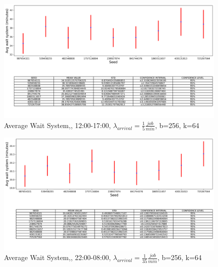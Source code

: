 \documentclass{article}
\begin{document}
\begin{figure}[H]
	\centering
	\captionsetup{justification=centering,margin=2cm}
	\includegraphics[scale=0.48]{images/avg_ws_steady_state_aft.png}
	\caption{Average Wait System,, 12:00-17:00, $\lambda_{arrival}=\frac{1}{5} \frac{job}{min}$, b=256, k=64}\label{figura:avg_ws_steady_state_eve}
\end{figure}

\begin{figure}[H]
	\centering
	\captionsetup{justification=centering,margin=2cm}
	\includegraphics[scale=0.48]{images/avg_ws_steady_state_night.png}
	\caption{Average Wait System,, 22:00-08:00, $\lambda_{arrival}=\frac{1}{35} \frac{job}{min}$, b=256, k=64}\label{figura:avg_ws_steady_state_night}
\end{figure}
\end{document}
